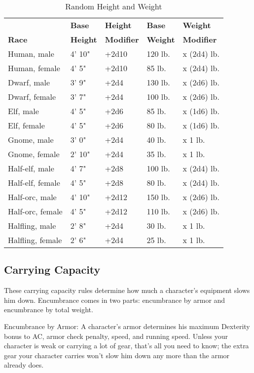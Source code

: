 \begin{table}[htb]
\sffamily
{}
\setlength{\tabcolsep}{1pt}
\caption{Random Height and Weight}
\begin{tabular}{lllll}
              & \textbf{Base}   & \textbf{Height}   & \textbf{Base}   & \textbf{Weight}\\
\textbf{Race} & \textbf{Height} & \textbf{Modifier} & \textbf{Weight} & \textbf{Modifier}\\
Human, male & 4' 10" & +2d10 & 120 lb. & x (2d4) lb.\\
Human, female & 4' 5" & +2d10 & 85 lb. & x (2d4) lb.\\
Dwarf, male & 3' 9" & +2d4 & 130 lb. & x (2d6) lb.\\
Dwarf, female & 3' 7" & +2d4 & 100 lb. & x (2d6) lb.\\
Elf, male & 4' 5" & +2d6 & 85 lb. & x (1d6) lb.\\
Elf, female & 4' 5" & +2d6 & 80 lb. & x (1d6) lb.\\
Gnome, male & 3' 0" & +2d4 & 40 lb. & x 1 lb.\\
Gnome, female & 2' 10" & +2d4 & 35 lb. & x 1 lb.\\
Half-elf, male & 4' 7" & +2d8 & 100 lb. & x (2d4) lb.\\
Half-elf, female & 4' 5" & +2d8 & 80 lb. & x (2d4) lb.\\
Half-orc, male & 4' 10" & +2d12 & 150 lb. & x (2d6) lb.\\
Half-orc, female & 4' 5" & +2d12 & 110 lb. & x (2d6) lb.\\
Halfling, male & 2' 8" & +2d4 & 30 lb. & x 1 lb.\\
Halfling, female & 2' 6" & +2d4 & 25 lb. & x 1 lb.\\
\end{tabular}
\end{table}

\subsection{Carrying Capacity}

				
These carrying capacity rules determine how much a character's equipment slows him down. Encumbrance comes in two parts: encumbrance by armor and encumbrance by total weight.
				
Encumbrance by Armor: A character's armor determines his maximum Dexterity bonus to AC, armor check penalty, speed, and running speed. Unless your character is weak or carrying a lot of gear, that's all you need to know; the extra gear your character carries won't slow him down any more than the armor already does.
				
